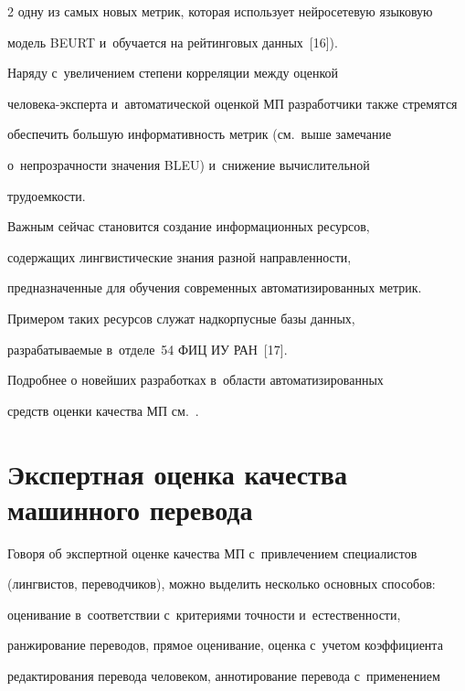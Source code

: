 \begin{multicols}{2}
одну из самых новых мет\-рик, которая использует нейросетевую языковую 


модель \mbox{BEURT} и~обуча\-ет\-ся на рейтинговых данных~[16]).


  


  Наряду с~увеличением степени корреляции между оценкой 


  человека-эксперта и~автоматической оценкой МП разработчики также стремятся 


обеспечить большую информативность метрик (см.\ выше замечание 


о~непрозрачности значения BLEU) и~снижение вычислительной 


трудоемкости.


  


  Важным сейчас становится создание информационных ресурсов, 


содержащих лингвистические знания разной направленности, 


предназначенные для обучения современных автоматизированных метрик. 


Примером таких ресурсов служат надкорпусные базы данных, 


разрабатываемые в~отделе~54 ФИЦ ИУ РАН~[17].


  


  Подробнее о новейших разработках в~области автоматизированных 


средств оценки качества МП см.~\cite[с.~59--64]{10-nur}.


  


  \section{Экспертная оценка качества машинного перевода}


  


  Говоря об экспертной оценке качества МП с~привлечением специалистов 


(лингвистов, переводчиков), можно выделить несколько основных способов: 


оценивание в~соответствии с~критериями точности и~естественности, 


ранжирование переводов, прямое оценивание, оценка с~учетом коэффициента 


редактирования перевода человеком, аннотирование перевода с~применением 



\end{multicols}
